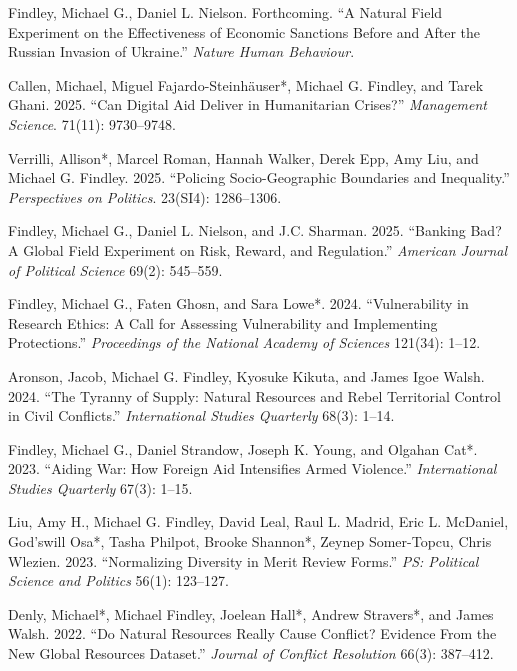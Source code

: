 \documentclass[10pt]{article}
\begin{document}
\begin{etaremune}

\item Findley, Michael G., Daniel L. Nielson. Forthcoming. ``A Natural Field Experiment on the Effectiveness of Economic Sanctions Before and After the Russian Invasion of Ukraine.'' \textit{Nature Human Behaviour}.

\item Callen, Michael, Miguel Fajardo-Steinh{\"a}user*, Michael G. Findley, and Tarek Ghani. 2025. ``Can Digital Aid Deliver in Humanitarian Crises?'' \textit{Management Science}. 71(11): 9730--9748.

\item Verrilli, Allison*, Marcel Roman, Hannah Walker, Derek Epp, Amy Liu, and Michael G. Findley. 2025. ``Policing Socio-Geographic Boundaries and Inequality.''  \textit{Perspectives on Politics}. 23(SI4): 1286--1306.

\item Findley, Michael G., Daniel L. Nielson, and J.C. Sharman. 2025. ``Banking Bad? A Global Field Experiment on Risk, Reward, and Regulation.'' \textit{American Journal of Political Science} 69(2): 545--559.

\item Findley, Michael G., Faten Ghosn, and Sara Lowe*. 2024. ``Vulnerability in Research Ethics: A Call for Assessing Vulnerability and Implementing Protections.'' \textit{Proceedings of the National Academy of Sciences} 121(34): 1--12. 

\item Aronson, Jacob, Michael G. Findley, Kyosuke Kikuta, and James Igoe Walsh. 2024. ``The Tyranny of Supply: Natural Resources and Rebel Territorial Control in Civil Conflicts.'' \textit{International Studies Quarterly} 68(3): 1--14.

\item Findley, Michael G., Daniel Strandow, Joseph K. Young, and Olgahan Cat*. 2023. ``Aiding War: How Foreign Aid Intensifies Armed Violence.'' \textit{International Studies Quarterly} 67(3): 1--15.

\item Liu, Amy H., Michael G. Findley, David Leal, Raul L. Madrid, Eric L. McDaniel, God'swill Osa*, Tasha Philpot, Brooke Shannon*, Zeynep Somer-Topcu, Chris Wlezien. 2023. ``Normalizing Diversity in Merit Review Forms.'' \textit{PS: Political Science and Politics} 56(1): 123--127.

\item Denly, Michael*, Michael Findley, Joelean Hall*, Andrew Stravers*, and James Walsh. 2022. ``Do Natural Resources Really Cause Conflict? Evidence From the New Global Resources Dataset.'' \textit{Journal of Conflict Resolution} 66(3): 387--412.


\end{etaremune}
\end{document}
